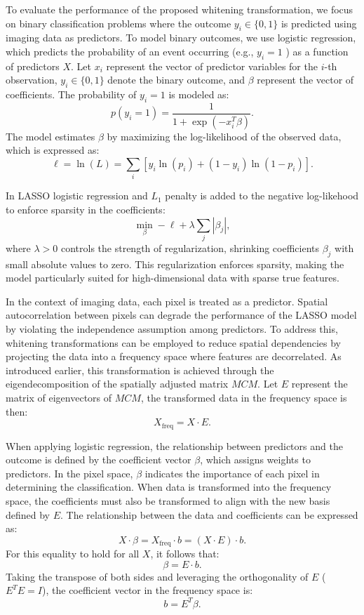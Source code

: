 \documentclass[12pt]{article}
\begin{document}
To evaluate the performance of the proposed whitening transformation, we focus on binary classification problems where the outcome \( y_i \in \{0, 1\} \) is predicted using imaging data as predictors. To model binary outcomes, we use logistic regression, which predicts the probability of an event occurring (e.g., \( y_i = 1 \) ) as a function of predictors \( X \). Let \( x_i \) represent the vector of predictor variables for the \( i \)-th observation, \( y_i \in \{ 0, 1 \} \) denote the binary outcome, and \( \beta \) represent the vector of coefficients. The probability of \( y_i = 1 \) is modeled as:
\[
	p(y_i = 1) = \frac{1}{1 + \exp(-x_i^T \beta)}.
\]
The model estimates \( \beta \) by maximizing the log-likelihood of the observed data, which is expressed as:
\[
	\ell = \ln(L) = \sum_i \left[ y_i \ln(p_i) + (1 - y_i) \ln(1 - p_i) \right].
\]

In LASSO logistic regression and \( L_1 \) penalty is added to the negative log-likehood to enforce sparsity in the coefficients:
\[
	\min_{\beta} - \ell + \lambda \sum_j |\beta_j|,
\]
where \( \lambda > 0 \) controls the strength of regularization, shrinking coefficients \( \beta_j \) with small absolute values to zero. This regularization enforces sparsity, making the model particularly suited for high-dimensional data with sparse true features.

In the context of imaging data, each pixel is treated as a predictor. Spatial autocorrelation between pixels can degrade the performance of the LASSO model by violating the independence assumption among predictors. To address this, whitening transformations can be employed to reduce spatial dependencies by projecting the data into a frequency space where features are decorrelated. As introduced earlier, this transformation is achieved through the eigendecomposition of the spatially adjusted matrix \( MCM \). Let \( E \) represent the matrix of eigenvectors of \( MCM \), the transformed data in the frequency space is then:
\[
	X_{\text{freq}} = X \cdot E.
\]

When applying logistic regression, the relationship between predictors and the outcome is defined by the coefficient vector \( \beta \), which assigns weights to predictors. In the pixel space, \( \beta \) indicates the importance of each pixel in determining the classification. When data is transformed into the frequency space, the coefficients must also be transformed to align with the new basis defined by \( E \). The relationship between the data and coefficients can be expressed as:
\[
	X \cdot \beta = X_{\text{freq}} \cdot b = (X \cdot E) \cdot b.
\]
For this equality to hold for all \( X \), it follows that:
\[
	\beta = E \cdot b.
\]
Taking the transpose of both sides and leveraging the orthogonality of \( E \) (\( E^T E = I \)), the coefficient vector in the frequency space is:
\[
	b = E^T \beta.
\]
\end{document}
